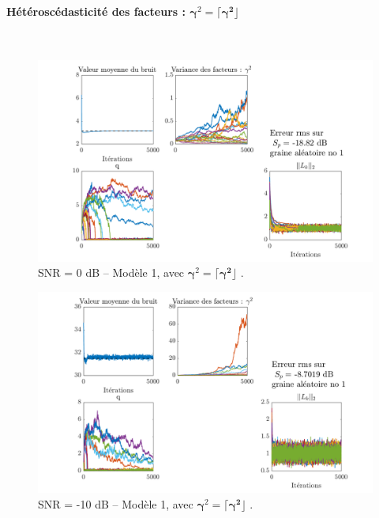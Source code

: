 \documentclass[ 12pt]{article}
\newcommand{\diag}[1]{\lceil#1\rfloor}
\begin{document}
\paragraph{Hétéroscédasticité des facteurs : $\bm{\gamma}^2 = \diag{\bm{\gamma^2 }}$} ~\\
\begin{figure}[H]
	\centering
	\includegraphics[width=\textwidth]{ToyCase/modele1_diffgamma2.png}	
	\caption{SNR = 0 dB  -- Modèle 1, avec $\bm{\gamma}^2  = \diag{\bm{\gamma^2 }}$ .}
\end{figure}
\begin{figure}[H]
	\centering
	\includegraphics[width=\textwidth]{ToyCase/modele1_diffgamma2_snrm10db.png}	
	\caption{SNR = -10 dB  -- Modèle 1, avec $\bm{\gamma}^2  = \diag{\bm{\gamma^2 }}$ .}
\end{figure}

\newpage
\end{document}
